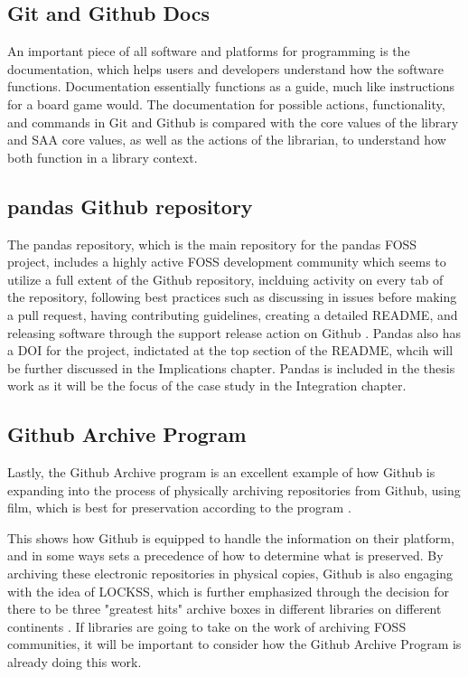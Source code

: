 \subsection{Git and Github Docs}

An important piece of all software and platforms for programming is the documentation, which helps users and developers understand how the software functions. Documentation essentially functions as a guide, much like instructions for a board game would. The documentation for possible actions, functionality, and commands in Git and Github is compared with the core values of the library and SAA core values, as well as the actions of the librarian, to understand how both function in a library context. 

\subsection{pandas Github repository}

The pandas repository, which is the main repository for the pandas FOSS project, includes a highly active FOSS development community which seems to utilize a full extent of the Github repository, inclduing activity on every tab of the repository, following best practices such as discussing in issues before making a pull request, having contributing guidelines, creating a detailed README, and releasing software through the support release action on Github \cite{pandasrepo}. Pandas also has a DOI for the project, indictated at the top section of the README, whcih will be further discussed in the Implications chapter. Pandas is included in the thesis work as it will be the focus of the case study in the Integration chapter. 

\subsection{Github Archive Program}

Lastly, the Github Archive program is an excellent example of how Github is expanding into the process of physically archiving repositories from Github, using film, which is best for preservation according to the program \cite{githubarchiveboxes} \cite{arcticcodevault}. 

This shows how Github is equipped to handle the information on their platform, and in some ways sets a precedence of how to determine what is preserved. By archiving these electronic repositories in physical copies, Github is also engaging with the idea of LOCKSS, which is further emphasized through the decision for there to be three "greatest hits" archive boxes in different libraries on different continents \cite{arcticcodevault}. If libraries are going to take on the work of archiving FOSS communities, it will be important to consider how the Github Archive Program is already doing this work. 

